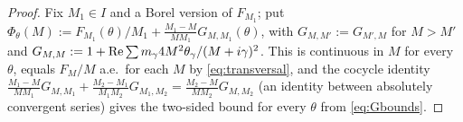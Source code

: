 \begin{proof}
Fix $M_1\in I$ and a Borel version of $F_{M_1}$; put $\Phi_\theta(M):=F_{M_1}(\theta)/M_1+\frac{M_1-M}{MM_1}G_{M,M_1}(\theta)$, with $G_{M,M'}:=G_{M',M}$ for $M>M'$ and $G_{M,M}:=1+\operatorname{Re}\sum m_\gamma4M^2\theta_\gamma/(M+i\gamma)^2$. This is continuous in $M$ for every $\theta$, equals $F_M/M$ a.e.\ for each $M$ by \eqref{eq:transversal}, and the cocycle identity $\frac{M_1-M}{MM_1}G_{M,M_1}+\frac{M_2-M_1}{M_1M_2}G_{M_1,M_2}=\frac{M_2-M}{MM_2}G_{M,M_2}$ (an identity between absolutely convergent series) gives the two-sided bound for every $\theta$ from \eqref{eq:Gbounds}.
\end{proof}
